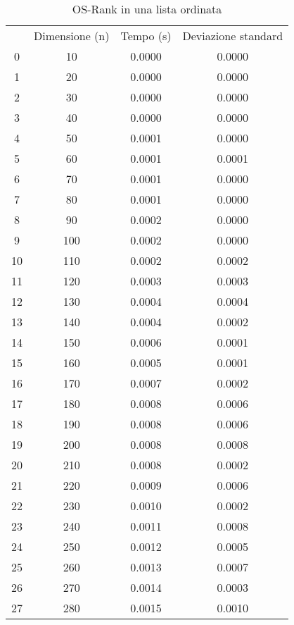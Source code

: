 \begin{table}
\centering
\caption{OS-Rank in una lista ordinata}
\label{OS-Rank in una lista ordinata}
\begin{adjustbox}{width=1\textwidth/2}
\begin{tabular}{|c|c|c|c|}
\hline
 & Dimensione (n) & Tempo (s) & Deviazione standard \\
0 & 10 & 0.0000 & 0.0000 \\
\cline{1-4}
1 & 20 & 0.0000 & 0.0000 \\
\cline{1-4}
2 & 30 & 0.0000 & 0.0000 \\
\cline{1-4}
3 & 40 & 0.0000 & 0.0000 \\
\cline{1-4}
4 & 50 & 0.0001 & 0.0000 \\
\cline{1-4}
5 & 60 & 0.0001 & 0.0001 \\
\cline{1-4}
6 & 70 & 0.0001 & 0.0000 \\
\cline{1-4}
7 & 80 & 0.0001 & 0.0000 \\
\cline{1-4}
8 & 90 & 0.0002 & 0.0000 \\
\cline{1-4}
9 & 100 & 0.0002 & 0.0000 \\
\cline{1-4}
10 & 110 & 0.0002 & 0.0002 \\
\cline{1-4}
11 & 120 & 0.0003 & 0.0003 \\
\cline{1-4}
12 & 130 & 0.0004 & 0.0004 \\
\cline{1-4}
13 & 140 & 0.0004 & 0.0002 \\
\cline{1-4}
14 & 150 & 0.0006 & 0.0001 \\
\cline{1-4}
15 & 160 & 0.0005 & 0.0001 \\
\cline{1-4}
16 & 170 & 0.0007 & 0.0002 \\
\cline{1-4}
17 & 180 & 0.0008 & 0.0006 \\
\cline{1-4}
18 & 190 & 0.0008 & 0.0006 \\
\cline{1-4}
19 & 200 & 0.0008 & 0.0008 \\
\cline{1-4}
20 & 210 & 0.0008 & 0.0002 \\
\cline{1-4}
21 & 220 & 0.0009 & 0.0006 \\
\cline{1-4}
22 & 230 & 0.0010 & 0.0002 \\
\cline{1-4}
23 & 240 & 0.0011 & 0.0008 \\
\cline{1-4}
24 & 250 & 0.0012 & 0.0005 \\
\cline{1-4}
25 & 260 & 0.0013 & 0.0007 \\
\cline{1-4}
26 & 270 & 0.0014 & 0.0003 \\
\cline{1-4}
27 & 280 & 0.0015 & 0.0010 \\

\end{tabular}
\end{adjustbox}
\end{table}
